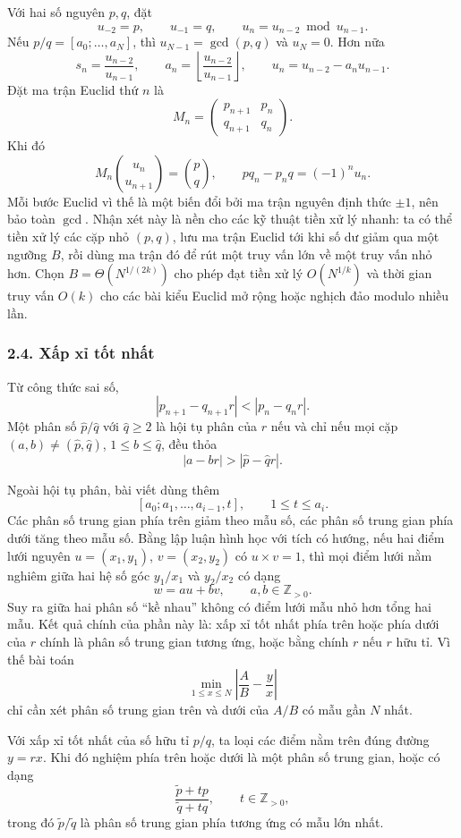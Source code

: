 \documentclass[11pt]{article}
\begin{document}
Với hai số nguyên \(p,q\), đặt
\[
  u_{-2}=p,\qquad u_{-1}=q,\qquad
  u_n=u_{n-2}\bmod u_{n-1}.
\]
Nếu \(p/q=[a_0;\ldots,a_N]\), thì \(u_{N-1}=\gcd(p,q)\) và \(u_N=0\). Hơn nữa
\[
  s_n=\frac{u_{n-2}}{u_{n-1}},\qquad
  a_n=\left\lfloor\frac{u_{n-2}}{u_{n-1}}\right\rfloor,\qquad
  u_n=u_{n-2}-a_nu_{n-1}.
\]
Đặt ma trận Euclid thứ \(n\) là
\[
  M_n=\begin{pmatrix}p_{n+1}&p_n\\ q_{n+1}&q_n\end{pmatrix}.
\]
Khi đó
\[
  M_n\binom{u_n}{u_{n+1}}=\binom{p}{q},
  \qquad
  pq_n-p_nq=(-1)^nu_n.
\]
Mỗi bước Euclid vì thế là một biến đổi bởi ma trận nguyên định thức \(\pm1\),
nên bảo toàn \(\gcd\). Nhận xét này là nền cho các kỹ thuật tiền xử lý nhanh:
ta có thể tiền xử lý các cặp nhỏ \((p,q)\), lưu ma trận Euclid tới khi số dư
giảm qua một ngưỡng \(B\), rồi dùng ma trận đó để rút một truy vấn lớn về một
truy vấn nhỏ hơn. Chọn \(B=\Theta(N^{1/(2k)})\) cho phép đạt tiền xử lý
\(O(N^{1/k})\) và thời gian truy vấn \(O(k)\) cho các bài kiểu Euclid mở rộng
hoặc nghịch đảo modulo nhiều lần.

\subsubsection*{2.4. Xấp xỉ tốt nhất}

Từ công thức sai số,
\[
  |p_{n+1}-q_{n+1}r|<|p_n-q_nr|.
\]
Một phân số \(\hat p/\hat q\) với \(\hat q\ge2\) là hội tụ phân của \(r\) nếu
và chỉ nếu mọi cặp \((a,b)\ne(\hat p,\hat q)\), \(1\le b\le\hat q\), đều thỏa
\[
  |a-br|>|\hat p-\hat q r|.
\]

Ngoài hội tụ phân, bài viết dùng thêm 
\[
  [a_0;a_1,\ldots,a_{i-1},t],\qquad 1\le t\le a_i.
\]
Các phân số trung gian phía trên giảm theo mẫu số, các phân số trung gian phía
dưới tăng theo mẫu số. Bằng lập luận hình học với tích có hướng, nếu hai điểm
lưới nguyên \(u=(x_1,y_1)\), \(v=(x_2,y_2)\) có \(u\times v=1\), thì mọi điểm
lưới nằm nghiêm giữa hai hệ số góc \(y_1/x_1\) và \(y_2/x_2\) có dạng
\[
  w=au+bv,\qquad a,b\in\mathbb Z_{>0}.
\]
Suy ra giữa hai phân số ``kề nhau'' không có điểm lưới mẫu nhỏ hơn tổng hai
mẫu. Kết quả chính của phần này là: xấp xỉ tốt nhất phía trên hoặc phía dưới
của \(r\) chính là phân số trung gian tương ứng, hoặc bằng chính \(r\) nếu
\(r\) hữu tỉ. Vì thế bài toán
\[
  \min_{1\le x\le N}\left|\frac AB-\frac yx\right|
\]
chỉ cần xét phân số trung gian trên và dưới của \(A/B\) có mẫu gần \(N\) nhất.

Với xấp xỉ tốt nhất  của số hữu tỉ \(p/q\), ta loại các điểm nằm
trên đúng đường \(y=rx\). Khi đó nghiệm phía trên hoặc dưới là một phân số
trung gian, hoặc có dạng
\[
  \frac{\tilde p+tp}{\tilde q+tq},
  \qquad t\in\mathbb Z_{>0},
\]
trong đó \(\tilde p/\tilde q\) là phân số trung gian phía tương ứng có mẫu lớn
nhất.
\end{document}
